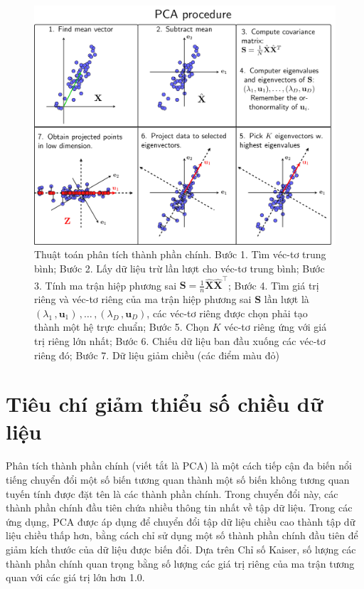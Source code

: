 \documentclass[../thesis.tex]{subfiles}
\begin{document}
\begin{figure}[H]
	\centering
	\includegraphics[width=0.8\linewidth]{images/pca_procedure}
	\caption[Thuật toán phân tích thành phần chính]{Thuật toán phân tích thành phần chính. Bước 1. Tìm véc-tơ trung bình; Bước 2. Lấy dữ liệu trừ lần lượt cho véc-tơ trung bình; Bước 3. Tính ma trận hiệp phương sai $ \mathbf{S} = \frac{1}{n}\widehat{\mathbf{X}} \widehat{\mathbf{X}}^\top $; Bước 4. Tìm giá trị riêng và véc-tơ riêng của ma trận hiệp phương sai $ \mathbf{S} $ lần lượt là $ (\lambda_1\,,\mathbf{u}_1)\,,\ldots\,,(\lambda_D\,,\mathbf{u}_D) $, các véc-tơ riêng được chọn phải tạo thành một hệ trực chuẩn; Bước 5. Chọn $ K $ véc-tơ riêng ứng với giá trị riêng lớn nhất; Bước 6. Chiếu dữ liệu ban đầu xuống các véc-tơ riêng đó; Bước 7. Dữ liệu giảm chiều (các điểm màu đỏ)}
	\label{fig:pcaprocedure}
\end{figure}

\section{Tiêu chí giảm thiểu số chiều dữ liệu}
Phân tích thành phần chính (viết tắt là PCA) là một cách tiếp cận đa biến nổi tiếng chuyển đổi một số biến tương quan thành một số biến không tương quan tuyến tính được đặt tên là các thành phần chính. Trong chuyển đổi này, các thành phần chính đầu tiên chứa nhiều thông tin nhất về tập dữ liệu. Trong các ứng dụng, PCA được áp dụng để chuyển đổi tập dữ liệu chiều cao thành tập dữ liệu chiều thấp hơn, bằng cách chỉ sử dụng một số thành phần chính đầu tiên để giảm kích thước của dữ liệu được biến đổi. Dựa trên Chỉ số Kaiser, số lượng các thành phần chính quan trọng bằng số lượng các giá trị riêng của ma trận tương quan với các giá trị lớn hơn 1.0.
\end{document}
